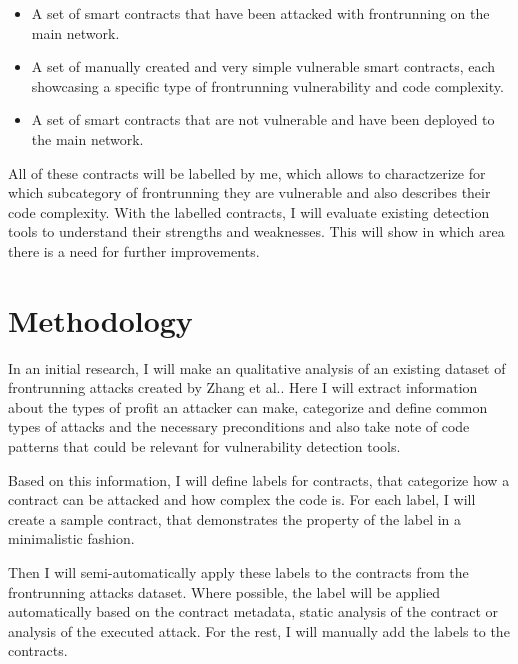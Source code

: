 \documentclass[paper=a4,fontsize=11pt,oneside,titlepage]{scrartcl}
\begin{document}
\begin{itemize}
  \item A set of smart contracts that have been attacked with frontrunning on the main network.
  \item A set of manually created and very simple vulnerable smart contracts, each showcasing a specific type of frontrunning vulnerability and code complexity.
  \item A set of smart contracts that are not vulnerable and have been deployed to the main network.
\end{itemize}

All of these contracts will be labelled by me, which allows to charactzerize for which subcategory of frontrunning they are vulnerable and also describes their code complexity. With the labelled contracts, I will evaluate existing detection tools to understand their strengths and weaknesses. This will show in which area there is a need for further improvements.

\iffalse
\begin{itemize}
\item What are the concrete goals and expected results?
\item How do these goals/results contribute to the problem of \autoref{sec:problem}?
\end{itemize}
\fi

\section{Methodology}
\label{sec:methods}

In an initial research, I will make an qualitative analysis of an existing dataset of frontrunning attacks created by Zhang et al.\cite{zhang_combatting_2023}. Here I will extract information about the types of profit an attacker can make, categorize and define common types of attacks and the necessary preconditions and also take note of code patterns that could be relevant for vulnerability detection tools.

Based on this information, I will define labels for contracts, that categorize how a contract can be attacked and how complex the code is. For each label, I will create a sample contract, that demonstrates the property of the label in a minimalistic fashion.

Then I will semi-automatically apply these labels to the contracts from the frontrunning attacks dataset\cite{zhang_combatting_2023}. Where possible, the label will be applied automatically based on the contract metadata, static analysis of the contract or analysis of the executed attack. For the rest, I will manually add the labels to the contracts.
\end{document}
